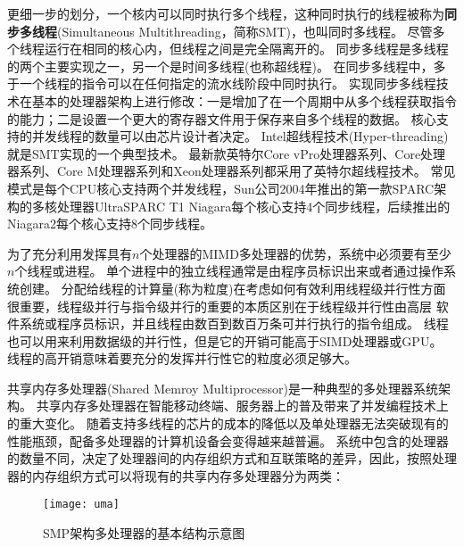 更细一步的划分，一个核内可以同时执行多个线程，这种同时执行的线程被称为\textbf{同步多线程}(Simultaneous Multithreading，简称SMT)，也叫同时多线程。
尽管多个线程运行在相同的核心内，但线程之间是完全隔离开的。
同步多线程是多线程的两个主要实现之一，另一个是时间多线程(也称超线程)。
在同步多线程中，多于一个线程的指令可以在任何指定的流水线阶段中同时执行。
实现同步多线程技术在基本的处理器架构上进行修改：一是增加了在一个周期中从多个线程获取指令的能力；二是设置一个更大的寄存器文件用于保存来自多个线程的数据。
核心支持的并发线程的数量可以由芯片设计者决定。
Intel超线程技术(Hyper-threading)就是SMT实现的一个典型技术\cite{marr2002hyper}。
最新款英特尔Core vPro处理器系列\cite{samson2005interface}、Core处理器系列\cite{lempel20112nd}、Core M处理器系列和Xeon处理器系列\cite{chang200765}都采用了英特尔超线程技术。
常见模式是每个CPU核心支持两个并发线程，Sun公司2004年推出的第一款SPARC架构的多核处理器UltraSPARC T1 Niagara每个核心支持4个同步线程\cite{kongetira2005niagara}，后续推出的Niagara2每个核心支持8个同步线程。

为了充分利用发挥具有$n$个处理器的MIMD多处理器的优势，系统中必须要有至少$n$个线程或进程。
单个进程中的独立线程通常是由程序员标识出来或者通过操作系统创建。
分配给线程的计算量(称为粒度)在考虑如何有效利用线程级并行性方面很重要，线程级并行与指令级并行的重要的本质区别在于线程级并行性由高层 软件系统或程序员标识，并且线程由数百到数百万条可并行执行的指令组成。
线程也可以用来利用数据级的并行性，但是它的开销可能高于SIMD处理器或GPU\cite{shi2012vcuda}。
线程的高开销意味着要充分的发挥并行性它的粒度必须足够大。

共享内存多处理器(Shared Memroy Multiprocessor)是一种典型的多处理器系统架构。
共享内存多处理器在智能移动终端、服务器上的普及带来了并发编程技术上的重大变化。
随着支持多线程的芯片的成本的降低以及单处理器无法突破现有的性能瓶颈，配备多处理器的计算机设备会变得越来越普遍。
系统中包含的处理器的数量不同，决定了处理器间的内存组织方式和互联策略的差异，因此，按照处理器的内存组织方式可以将现有的共享内存多处理器分为两类：

\begin{figure}
\centering
\texttt{[image: uma]}
\caption{SMP架构多处理器的基本结构示意图}
\label{fig:uma}
\end{figure}


